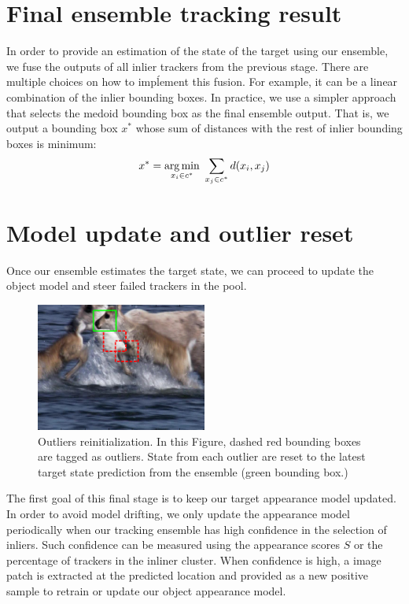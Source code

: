 \section{Final ensemble tracking result}
In order to provide an estimation of the state of the target using our
ensemble, we fuse the outputs of all inlier trackers from the previous stage.
There are multiple choices on how to impĺement this fusion. For example,
it can be a linear combination of the inlier bounding boxes. In practice,
we use a simpler approach that selects the medoid bounding box as the final
ensemble output. That is, we output a
bounding box $x^{*}$
whose sum of distances with the rest of inlier bounding boxes
is minimum:
\begin{equation}
x^{*} = \operatorname*{arg\,min}_{x_{i} \in c^*}  ~\sum_{x_{j} \in c^{*}}d(x_{i}, x_{j}) 
\end{equation}

\section{Model update and outlier reset}
Once our ensemble estimates the target state, we can proceed to update the
object model and steer failed trackers in the pool.

\begin{figure}[b!]
\centering
\includegraphics[width=0.5\textwidth]{Figures/clustering/deer_outliers.png}
\caption[Outliers reinitialization]{Outliers reinitialization. In this Figure,
dashed red bounding boxes are tagged as outliers. State from each outlier are
reset to the latest target state prediction from the ensemble (green bounding
box.)}
\label{fig::outliers}
\end{figure}

The first goal of this final stage is to keep our target appearance model
updated. In order to avoid model drifting, we only update the appearance
model periodically when our tracking ensemble has high confidence in the
selection of inliers. Such confidence can be measured using the appearance
scores $S$ or the percentage of trackers in the inliner cluster.
When confidence is high, a image patch is extracted at the predicted
location and provided as a new positive sample to retrain or update
our object appearance model.

